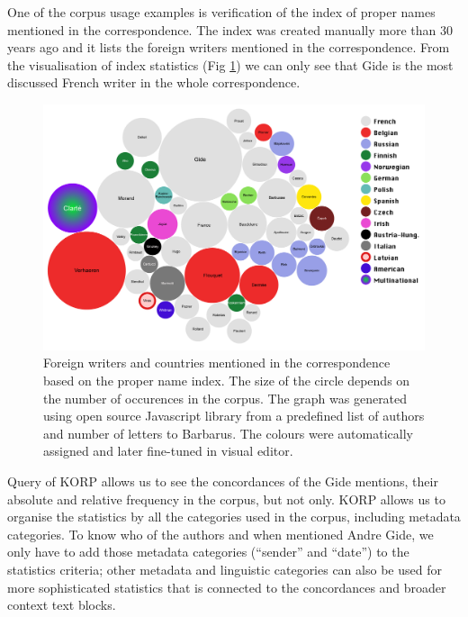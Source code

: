 \documentclass[runningheads]{llncs}
\begin{document}
One of the corpus usage examples is verification of the index of proper names mentioned in the correspondence. The index was created manually more than 30 years ago and it lists the foreign writers mentioned in the correspondence. From the visualisation of index statistics (Fig \ref{fig2}) we can only see that Gide is the most discussed French writer in the whole correspondence.

\begin{figure}
  \includegraphics[width=\textwidth]{mummud}
  \caption{Foreign writers and countries mentioned in the correspondence based on the proper name index.  The size of the circle depends on the number of occurences in the corpus. The graph was generated using open source Javascript library from a predefined list of authors and number of letters to Barbarus. The colours were automatically assigned and later fine-tuned in visual editor.}
  \label{fig2}
\end{figure}


Query of KORP allows us to see the concordances of the Gide mentions, their absolute and relative frequency in the corpus, but not only. KORP allows us to organise the statistics by all the categories used in the corpus, including metadata categories. To know who of the authors and when mentioned Andre Gide, we only have to add those metadata categories (``sender'' and ``date'') to the statistics criteria; other metadata and linguistic categories can also be used for more sophisticated statistics that is connected to the concordances and broader context text blocks. 
\end{document}
